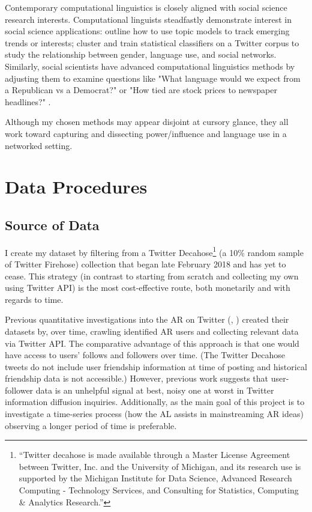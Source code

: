 \documentclass[acmlarge, screen, authorversion]{acmart}
\begin{document}
Contemporary computational linguistics is closely aligned with social science research interests. Computational linguists steadfastly demonstrate interest in social science applications: \citep{lauOnlineTrendAnalysis} outline how to use topic models to track emerging trends or interests; \cite{bammanGenderIdentityLexical2014} cluster and train statistical classifiers on a Twitter corpus to study the relationship between gender, language use, and social networks. Similarly, social scientists have advanced computational linguistics methods by adjusting them to examine questions like "What language would we expect from a Republican vs a Democrat?" or "How tied are stock prices to newspaper headlines?"  \cite{monroeFightinWordsLexical2008, gentzkowTextData2019}.

Although my chosen methods may appear disjoint at cursory glance, they all work toward capturing and dissecting power/influence and language use in a networked setting.


\section{Data Procedures}

\subsection{Source of Data}

I create my dataset by filtering from a Twitter Decahose\footnote{“Twitter decahose is made available through a Master License Agreement between Twitter, Inc. and the University of Michigan, and its research use is supported by the Michigan Institute for Data Science, Advanced Research Computing - Technology Services, and Consulting for Statistics, Computing \& Analytics Research.”} (a 10\% random sample of Twitter Firehose) collection that began late February 2018 and has yet to cease. This strategy (in contrast to starting from scratch and collecting my own using Twitter API) is the most cost-effective route, both monetarily and with regards to time.

Previous quantitative investigations into the AR on Twitter (\cite{bergerAltrightTwitterCensus2018}, \cite{alizadehPsychologyMoralityPolitical2019}) created their datasets by, over time, crawling identified AR users and collecting relevant data via Twitter API. The comparative advantage of this approach is that one would have access to users' follows and followers over time. (The Twitter Decahose tweets do not include user friendship information at time of posting and historical friendship data is not accessible.) However, previous work \cite{chaMeasuringUserInfluence2010, versteegInformationtheoreticMeasuresInfluence2013} suggests that user-follower data is an unhelpful signal at best, noisy one at worst in Twitter information diffusion inquiries. Additionally, as the main goal of this project is to investigate a time-series process (how the AL assists in mainstreaming AR ideas) observing a longer period of time is preferable.
\end{document}
